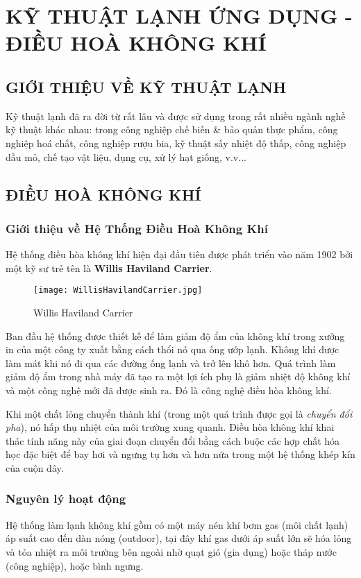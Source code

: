 	\section{KỸ THUẬT LẠNH ỨNG DỤNG - ĐIỀU HOÀ KHÔNG KHÍ}
	\subsection{GIỚI THIỆU VỀ KỸ THUẬT LẠNH}
	Kỹ thuật lạnh đã ra đời từ rất lâu và được sử dụng trong rất nhiều ngành nghề kỹ thuật khác nhau: trong công nghiệp chế biến \& bảo quản thực phẩm, công nghiệp hoá chất, công nghiệp rượu bia, kỹ thuật sấy nhiệt độ thấp, công nghiệp dầu mỏ, chế tạo vật liệu, dụng cụ, xử lý hạt giống, v.v...
	
	\subsection{ĐIỀU HOÀ KHÔNG KHÍ}
	\subsubsection{Giới thiệu về Hệ Thống Điều Hoà Không Khí}
	Hệ thống điều hòa không khí hiện đại đầu tiên được phát triển vào năm 1902 bởi một kỹ sư trẻ tên là \textbf{Willis Haviland Carrier}. 
	
	\begin{wrapfigure}{r}{0.3\textwidth}
		\texttt{[image: WillisHavilandCarrier.jpg]} 
		\caption{Willis Haviland Carrier}
	\end{wrapfigure}

	Ban đầu hệ thống được thiết kế để làm giảm độ ẩm của không khí trong xưởng in của một công ty xuất bằng cách thổi nó qua ống ướp lạnh. Không khí được làm mát khi nó đi qua các đường ống lạnh và trở lên khô hơn. Quá trình làm giảm độ ẩm trong nhà máy đã tạo ra một lợi ích phụ là giảm nhiệt độ không khí và một công nghệ mới đã được sinh ra. Đó là công nghệ điều hòa không khí.
	
	Khi một chất lỏng chuyển thành khí (trong một quá trình được gọi là \emph{chuyển đổi pha}), nó hấp thụ nhiệt của môi trường xung quanh. Điều hòa không khí khai thác tính năng này của giai đoạn chuyển đổi bằng cách buộc các hợp chất hóa học đặc biệt để bay hơi và ngưng tụ hơn và hơn nữa trong một hệ thống khép kín của cuộn dây.
	
	\subsubsection{Nguyên lý hoạt động}
	Hệ thống làm lạnh không khí gồm có một máy nén khí bơm gas (môi chất lạnh) áp suất cao đến dàn nóng (outdoor), tại đây khí gas dưới áp suất lớn sẽ hóa lỏng và tỏa nhiệt ra môi trường bên ngoài nhờ quạt gió (gia dụng) hoặc tháp nước (công nghiệp), hoặc bình ngưng.

